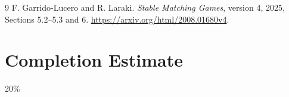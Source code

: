 \documentclass[11pt]{article}
\theoremstyle{definition}
\theoremstyle{remark}
\begin{document}
\begin{thebibliography}{9}
 F. Garrido-Lucero and R. Laraki.
\emph{Stable Matching Games}, version 4, 2025, Sections 5.2--5.3 and 6.
\url{https://arxiv.org/html/2008.01680v4}.
\end{thebibliography}

\section{Completion Estimate}
20\%
\end{document}
